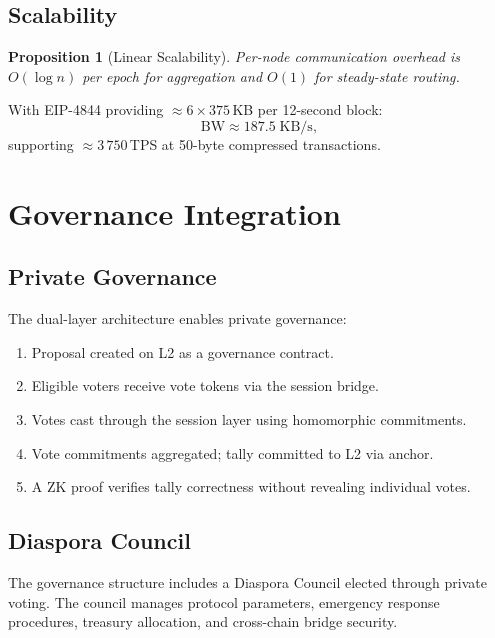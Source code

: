 \documentclass[11pt,a4paper]{article}
\newtheorem{proposition}{Proposition}[section]
\begin{document}
\subsection{Scalability}

\begin{proposition}[Linear Scalability]
    Per-node communication overhead is $O(\log n)$ per epoch for
    aggregation and $O(1)$ for steady-state routing.
\end{proposition}

With EIP-4844 providing $\approx 6 \times 375$\,KB per 12-second block:
\[
    \mathrm{BW} \approx 187.5\;\text{KB/s},
\]
supporting $\approx 3\,750$\,TPS at 50-byte compressed transactions.

\section{Governance Integration}
\label{sec:governance}

\subsection{Private Governance}

The dual-layer architecture enables private governance:

\begin{enumerate}
    \item Proposal created on L2 as a governance contract.
    \item Eligible voters receive vote tokens via the session bridge.
    \item Votes cast through the session layer using homomorphic
    commitments.
    \item Vote commitments aggregated; tally committed to L2 via anchor.
    \item A ZK proof verifies tally correctness without revealing
    individual votes.
\end{enumerate}

\subsection{Diaspora Council}

The governance structure includes a Diaspora Council elected through
private voting.  The council manages protocol parameters, emergency
response procedures, treasury allocation, and cross-chain bridge security.
\end{document}
